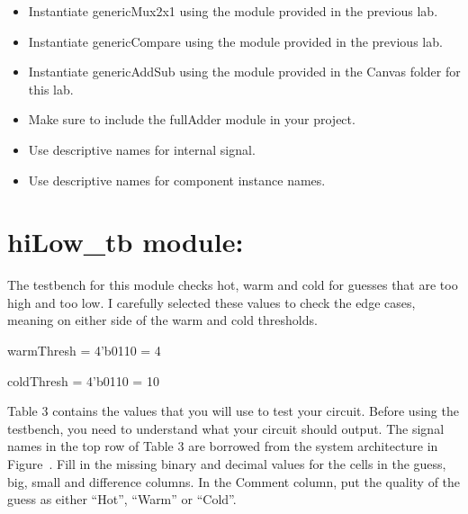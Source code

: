 \begin{itemize}
\item
  Instantiate genericMux2x1 using the module provided in the previous
  lab.
\item
  Instantiate genericCompare using the module provided in the previous
  lab.
\item
  Instantiate genericAddSub using the module provided in the Canvas
  folder for this lab.
\item
  Make sure to include the fullAdder module in your project.
\item
  Use descriptive names for internal signal.
\item
  Use descriptive names for component instance names.
\end{itemize}

\hypertarget{hilow_tb-module}{%
\section{hiLow\_tb module:}\label{hilow_tb-module}}

The testbench for this module checks hot, warm and cold for guesses that
are too high and too low. I carefully selected these values to check the
edge cases, meaning on either side of the warm and cold thresholds.

warmThresh = 4'b0110 = 4

coldThresh = 4'b0110 = 10

Table 3 contains the values that you will use to test your circuit.
Before using the testbench, you need to understand what your circuit
should output. The signal names in the top row of Table 3 are borrowed
from the system architecture in Figure~. Fill in the missing binary and
decimal values for the cells in the guess, big, small and difference
columns. In the Comment column, put the quality of the guess as either
``Hot'', ``Warm'' or ``Cold''.


